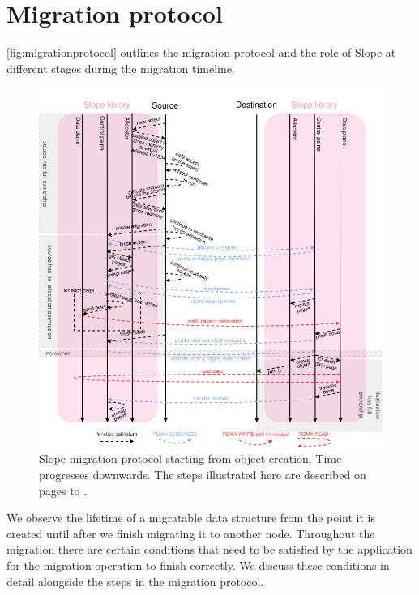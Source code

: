 \label{migration_protocol_start_label}
\section{Migration protocol}
\label{sec:migrationprotocol}

\autoref{fig:migrationprotocol} outlines the migration protocol and the role
of Slope at different stages during the migration timeline.

\begin{figure}[tp]
\centering

\includegraphics[width=1\textwidth]{migration-protocol.drawio}
\caption{
    Slope migration protocol starting from object creation. Time progresses
    downwards.
    The steps illustrated here are described on pages \pageref{migration_protocol_start_label} to \pageref{migration_protocol_end_label}.
}
\label{fig:migrationprotocol}
\end{figure}

We observe the lifetime of a migratable data structure from the point it is
created until after we finish migrating it to another node.
Throughout the migration
there are certain conditions that need to be satisfied by the application
for the migration operation to finish correctly. We discuss these conditions
in detail alongside the steps in the migration protocol.

